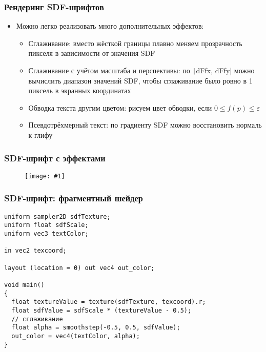 \documentclass{beamer}
\newcommand{\slideimage}[1]{
  \begin{figure}
    \begin{adjustbox}{width=\textwidth, totalheight=\textheight-2\baselineskip-2\baselineskip,keepaspectratio}
      \texttt{[image: \#1]}
    \end{adjustbox}
  \end{figure}
}
\begin{document}
\begin{frame}[fragile]
\frametitle{Рендеринг SDF-шрифтов}
\begin{itemize}
\item Можно легко реализовать много дополнительных эффектов:
\pause
\begin{itemize}
\item Сглаживание: вместо жёсткой границы плавно меняем прозрачность пикселя в зависимости от значения SDF
\pause
\item Сглаживание с учётом масштаба и перспективы: по \texttt|dFfx, dFfy| можно вычислить диапазон значений SDF, чтобы сглаживание было ровно в 1 пиксель в экранных координатах
\pause
\item Обводка текста другим цветом: рисуем цвет обводки, если \begin{math}0 \leq f(p) \leq \varepsilon\end{math}
\pause
\item Псевдотрёхмерный текст: по градиенту SDF можно восстановить нормаль к глифу
\end{itemize}
\end{itemize}
\end{frame}

\begin{frame}[fragile]
\frametitle{SDF-шрифт с эффектами}
\slideimage{sdf-effects.png}
\end{frame}

\begin{frame}[fragile]
\frametitle{SDF-шрифт: фрагментный шейдер}
\begin{verbatim}
uniform sampler2D sdfTexture;
uniform float sdfScale;
uniform vec3 textColor;

in vec2 texcoord;

layout (location = 0) out vec4 out_color;

void main()
{
  float textureValue = texture(sdfTexture, texcoord).r;
  float sdfValue = sdfScale * (textureValue - 0.5);
  // сглаживание
  float alpha = smoothstep(-0.5, 0.5, sdfValue);
  out_color = vec4(textColor, alpha);
}
\end{verbatim}
\end{frame}
\end{document}
